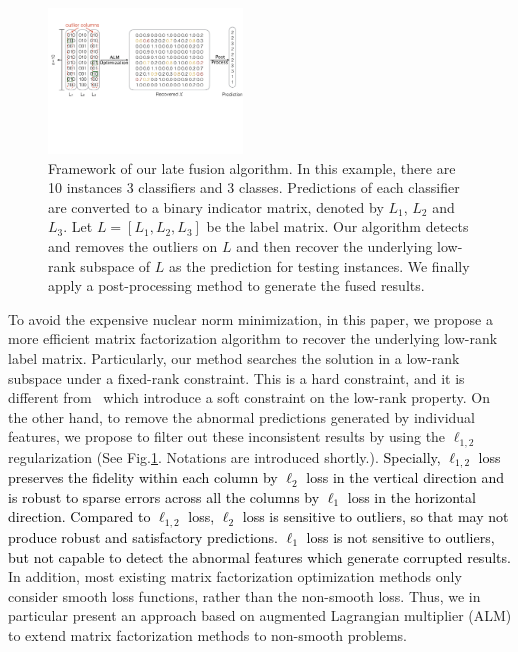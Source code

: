 \documentclass[10pt,twocolumn,letterpaper]{article}
\def\calC{{\mathcal{C}}}
\def\yanred{\textcolor{black}}
\begin{document}
\begin{figure}[!t]
\begin{center}
\includegraphics[width=0.46\textwidth]{resource/frame_work.pdf}
\end{center}
\caption{Framework of our late fusion algorithm.
In this example, there are 10 instances 3 classifiers and 3 classes.
Predictions of each classifier are converted to a binary indicator matrix,
denoted by $L_1$, $L_2$ and $L_3$.
Let $L = [L_1, L_2, L_3]$ be the label matrix.
Our algorithm detects and removes the outliers on $L$ and then recover the underlying low-rank subspace of $L$ as the prediction for testing instances.
We finally apply a post-processing method to generate the fused results.
}
\label{fig:framework}
\end{figure}

To avoid the expensive nuclear norm minimization,
in this paper, we propose a more efficient matrix factorization algorithm to recover the underlying low-rank label matrix.
Particularly, our method searches the solution in a low-rank subspace under a fixed-rank constraint.
This is a hard constraint, and it is different from~\cite{gaoijcai2016robust,ye2012robust} which introduce a soft constraint on the low-rank property.
On the other hand, to remove the abnormal predictions generated by individual features, we propose to filter out these inconsistent results by using the $\ell_{1,2}$ regularization (See Fig.\ref{fig:framework}.
Notations are introduced shortly.).
\yanred{
Specially, $\ell_{1,2}$ loss preserves the fidelity within each column by $\ell_{2}$ loss in the vertical direction and is robust to sparse errors across all the columns by $\ell_{1}$ loss in the horizontal direction.
Compared to $\ell_{1,2}$ loss, $\ell_{2}$ loss is sensitive to outliers, so that may not produce robust and satisfactory predictions.
$\ell_{1}$ loss is not sensitive to outliers, but not capable to detect the abnormal features which generate corrupted results.
}
In addition, most existing matrix factorization optimization methods only consider smooth loss functions, rather than the non-smooth loss.
Thus, we in particular present an approach based on augmented Lagrangian multiplier (ALM) to extend matrix factorization methods to non-smooth problems.
\end{document}
